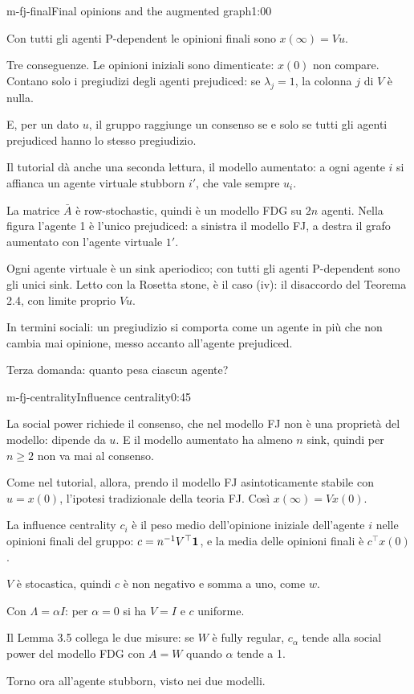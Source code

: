 \begin{slide}{m-fj-final}{Final opinions and the augmented graph}{1:00}
  \begin{discorso}
    \item Con tutti gli agenti P-dependent le opinioni finali sono $x(\infty)=Vu$.
    \item Tre conseguenze. Le opinioni iniziali sono dimenticate: $x(0)$ non compare. Contano solo i pregiudizi degli agenti prejudiced: se $\lambda_j=1$, la colonna $j$ di $V$ è nulla.
    \item E, per un dato $u$, il gruppo raggiunge un consenso se e solo se tutti gli agenti prejudiced hanno lo stesso pregiudizio.
    \item Il tutorial dà anche una seconda lettura, il modello aumentato: a ogni agente $i$ si affianca un agente virtuale stubborn $i'$, che vale sempre $u_i$.
    \item La matrice $\bar A$ è row-stochastic, quindi è un modello FDG su $2n$ agenti. Nella figura l'agente 1 è l'unico prejudiced: a sinistra il modello FJ, a destra il grafo aumentato con l'agente virtuale $1'$.
    \item Ogni agente virtuale è un sink aperiodico; con tutti gli agenti P-dependent sono gli unici sink. Letto con la Rosetta stone, è il caso (iv): il disaccordo del Teorema 2.4, con limite proprio $Vu$.
    \item In termini sociali: un pregiudizio si comporta come un agente in più che non cambia mai opinione, messo accanto all'agente prejudiced.
    \item Terza domanda: quanto pesa ciascun agente?
  \end{discorso}
\end{slide}

\begin{slide}{m-fj-centrality}{Influence centrality}{0:45}
  \begin{discorso}
    \item La social power richiede il consenso, che nel modello FJ non è una proprietà del modello: dipende da $u$. E il modello aumentato ha almeno $n$ sink, quindi per $n\ge2$ non va mai al consenso.
    \item Come nel tutorial, allora, prendo il modello FJ asintoticamente stabile con $u=x(0)$, l'ipotesi tradizionale della teoria FJ. Così $x(\infty)=Vx(0)$.
    \item La influence centrality $c_i$ è il peso medio dell'opinione iniziale dell'agente $i$ nelle opinioni finali del gruppo: $c=n^{-1}V^\top\mathbf{1}$, e la media delle opinioni finali è $c^\top x(0)$.
    \item $V$ è stocastica, quindi $c$ è non negativo e somma a uno, come $w$.
    \item Con $\Lambda=\alpha I$: per $\alpha=0$ si ha $V=I$ e $c$ uniforme.
    \item Il Lemma 3.5 collega le due misure: se $W$ è fully regular, $c_\alpha$ tende alla social power del modello FDG con $A=W$ quando $\alpha$ tende a 1.
    \item Torno ora all'agente stubborn, visto nei due modelli.
  \end{discorso}
\end{slide}


